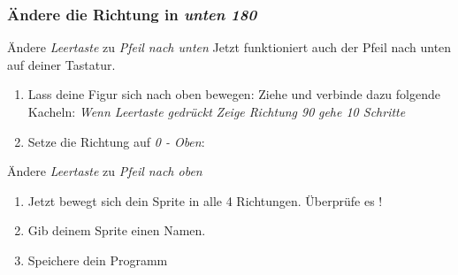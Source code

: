 \subsubsection{Ändere die Richtung in \textit{unten 180}}
Ändere \textit{Leertaste} zu \textit{Pfeil nach unten}
Jetzt funktioniert auch der Pfeil nach unten auf deiner Tastatur. 
\begin{enumerate}

\item Lass deine Figur sich nach oben bewegen: Ziehe und verbinde dazu folgende Kacheln:
\subitem \textit{Wenn Leertaste gedrückt}
\subitem \textit{Zeige Richtung 90}
\subitem \textit{gehe 10 Schritte}
\item Setze die Richtung auf  \textit{0 - Oben}:
\end{enumerate}
Ändere \textit{Leertaste} zu \textit{Pfeil nach oben}

\begin{enumerate}
\item Jetzt bewegt sich dein Sprite in alle 4 Richtungen. Überprüfe es !
\item Gib deinem Sprite einen Namen.
\item Speichere dein Programm
\end{enumerate}